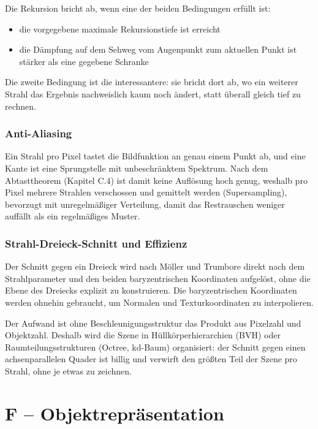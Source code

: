 \documentclass[12pt, a4paper]{article}
\begin{document}
Die Rekursion bricht ab, wenn eine der beiden Bedingungen erfüllt ist:

\begin{itemize}
  \item die vorgegebene maximale Rekursionstiefe ist erreicht
  \item die Dämpfung auf dem Sehweg vom Augenpunkt zum aktuellen Punkt ist stärker als
        eine gegebene Schranke
\end{itemize}

Die zweite Bedingung ist die interessantere: sie bricht dort ab, wo ein weiterer Strahl
das Ergebnis nachweislich kaum noch ändert, statt überall gleich tief zu rechnen.

\subsubsection*{Anti-Aliasing}

Ein Strahl pro Pixel tastet die Bildfunktion an genau einem Punkt ab, und eine Kante
ist eine Sprungstelle mit unbeschränktem Spektrum. Nach dem Abtasttheorem (Kapitel C.4)
ist damit keine Auflösung hoch genug, weshalb pro Pixel mehrere Strahlen verschossen und
gemittelt werden (Supersampling), bevorzugt mit unregelmäßiger Verteilung, damit das
Restrauschen weniger auffällt als ein regelmäßiges Muster.

\subsubsection*{Strahl-Dreieck-Schnitt und Effizienz}

Der Schnitt gegen ein Dreieck wird nach Möller und Trumbore direkt nach dem
Strahlparameter und den beiden baryzentrischen Koordinaten aufgelöst, ohne die Ebene
des Dreiecks explizit zu konstruieren. Die baryzentrischen Koordinaten werden ohnehin
gebraucht, um Normalen und Texturkoordinaten zu interpolieren.

Der Aufwand ist ohne Beschleunigungsstruktur das Produkt aus Pixelzahl und Objektzahl.
Deshalb wird die Szene in Hüllkörperhierarchien (BVH) oder Raumteilungsstrukturen
(Octree, kd-Baum) organisiert: der Schnitt gegen einen achsenparallelen Quader ist
billig und verwirft den größten Teil der Szene pro Strahl, ohne je etwas zu zeichnen.

\section{F -- Objektrepräsentation}
\end{document}
